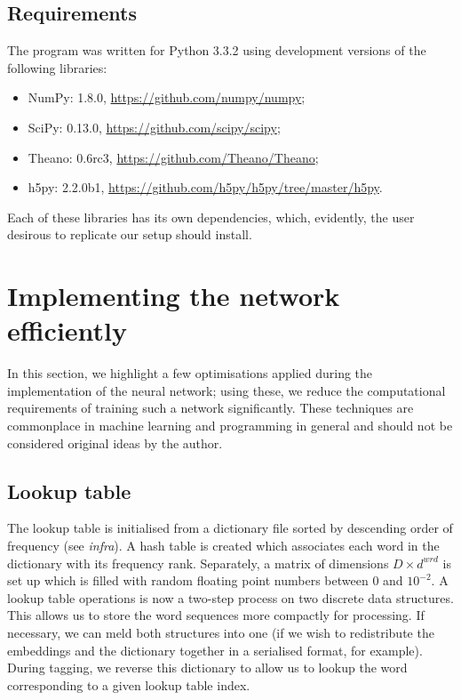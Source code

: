 \subsection{Requirements}
\label{sec:requirements}

The program was written for Python 3.3.2 using development versions of
the following libraries:

\begin{itemize}
\item NumPy: 1.8.0, \url{https://github.com/numpy/numpy};
\item SciPy: 0.13.0, \url{https://github.com/scipy/scipy};
\item Theano: 0.6rc3, \url{https://github.com/Theano/Theano};
\item h5py: 2.2.0b1, \url{https://github.com/h5py/h5py/tree/master/h5py}.
\end{itemize}

Each of these libraries has its own dependencies, which, evidently,
the user desirous to replicate our setup should install.

\section{Implementing the network efficiently}
\label{sec:implementation}

In this section, we highlight a few optimisations applied during the
implementation of the neural network; using these, we reduce the
computational requirements of training such a network
significantly. These techniques are commonplace in machine learning
and programming in general and should not be considered original ideas
by the author.

\subsection{Lookup table}
\label{sec:ltable}
The lookup table is initialised from a dictionary file sorted by
descending order of frequency (see \textit{infra}). A hash table is
created which associates each word in the dictionary with its
frequency rank. Separately, a matrix of dimensions $D \times d^{wrd}$
is set up which is filled with random floating point numbers between
$0$ and $10^{-2}$. A lookup table operations is now a two-step process
on two discrete data structures. This allows us to store the word
sequences more compactly for processing. If necessary, we can meld
both structures into one (if we wish to redistribute the embeddings
and the dictionary together in a serialised format, for
example). During tagging, we reverse this dictionary to allow us to
lookup the word corresponding to a given lookup table index.

